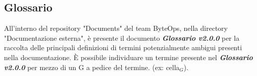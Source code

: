 \subsection{Glossario}
All'interno del repository "Documents" del team ByteOps, nella directory "Documentazione esterna", è presente il documento \textbf{\textit{Glossario v2.0.0}} per la raccolta delle principali definizioni di termini potenzialmente ambigui presenti nella documentazione.
È possibile individuare un termine presente nel \textbf{\textit{Glossario v2.0.0}} per mezzo di un G a pedice del termine. (ex: cella\(_G\)).
\vspace{0.1cm}
